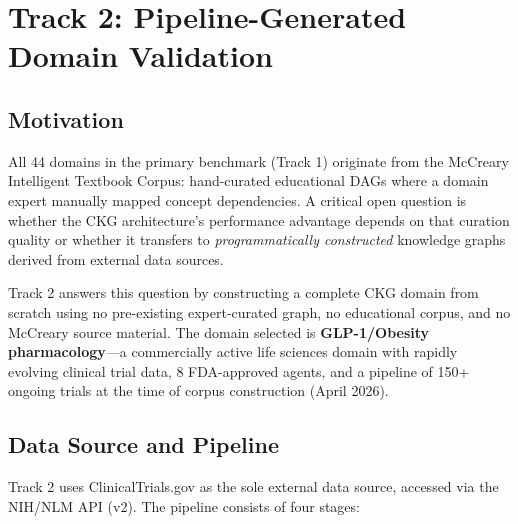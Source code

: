 
\section{Track 2: Pipeline-Generated Domain Validation}\label{sec:track2}

\subsection{Motivation}

All 44 domains in the primary benchmark (Track 1) originate from the
McCreary Intelligent Textbook Corpus: hand-curated educational DAGs
where a domain expert manually mapped concept dependencies.
A critical open question is whether the CKG architecture's performance
advantage depends on that curation quality or whether it transfers to
\textit{programmatically constructed} knowledge graphs derived from
external data sources.

Track 2 answers this question by constructing a complete CKG domain
from scratch using no pre-existing expert-curated graph, no educational
corpus, and no McCreary source material. The domain selected is
\textbf{GLP-1/Obesity pharmacology}---a commercially active life
sciences domain with rapidly evolving clinical trial data, 8 FDA-approved
agents, and a pipeline of 150+ ongoing trials at the time of corpus
construction (April 2026).

\subsection{Data Source and Pipeline}

Track 2 uses ClinicalTrials.gov as the sole external data source,
accessed via the NIH/NLM API (v2). The pipeline consists of four stages:


